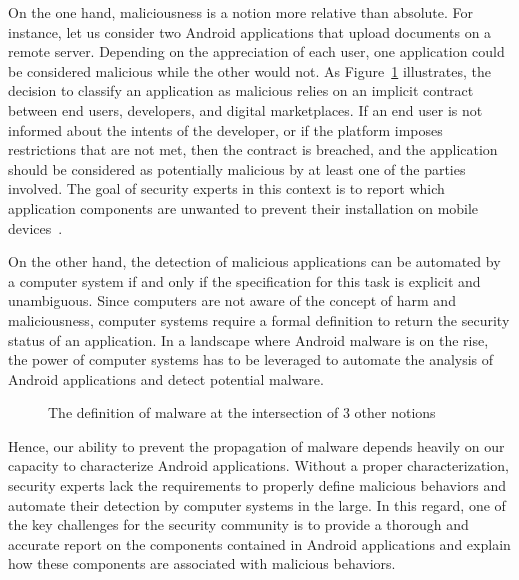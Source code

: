 On the one hand, maliciousness is a notion more relative than absolute.
For instance, let us consider two Android applications that upload documents on a remote server.
Depending on the appreciation of each user, one application could be considered malicious while the other would not.
As Figure~\ref{figure:introduction:definition} illustrates, the decision to classify an application as malicious relies on an implicit contract between end users, developers, and digital marketplaces.
If an end user is not informed about the intents of the developer, or if the platform imposes restrictions that are not met, then the contract is breached, and the application should be considered as potentially malicious by at least one of the parties involved.
The goal of security experts in this context is to report which application components are unwanted to prevent their installation on mobile devices~\cite{google_android_2018}.

On the other hand, the detection of malicious applications can be automated by a computer system if and only if the specification for this task is explicit and unambiguous.
Since computers are not aware of the concept of harm and maliciousness, computer systems require a formal definition to return the security status of an application.
In a landscape where Android malware is on the rise, the power of computer systems has to be leveraged to automate the analysis of Android applications and detect potential malware.

\begin{figure}[!ht]
	\centering
	
	\caption{The definition of malware at the intersection of 3 other notions}
	\label{figure:introduction:definition}
\end{figure}

Hence, our ability to prevent the propagation of malware depends heavily on our capacity to characterize Android applications.
Without a proper characterization, security experts lack the requirements to properly define malicious behaviors and automate their detection by computer systems in the large.
In this regard, one of the key challenges for the security community is to provide a thorough and accurate report on the components contained in Android applications and explain how these components are associated with malicious behaviors.
